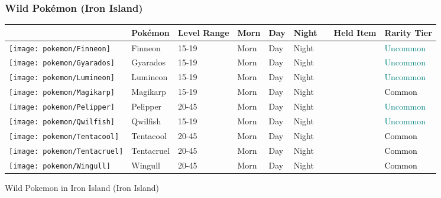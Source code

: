 \subsubsection{Wild Pokémon (Iron Island)}%
\label{ssubsec:WildPokmon(IronIsland)}%
\begin{longtable}{||l l l l l l l l l||}%
\hline%
&Pokémon&Level Range&Morn&Day&Night&&Held Item&Rarity Tier\\%
\hline%
\endhead%
\hline%
\texttt{[image: pokemon/Finneon]}&Finneon&15{-}19&Morn&Day&Night&&&\textcolor{teal}{%
Uncommon%
}\\%
\hline%
\texttt{[image: pokemon/Gyarados]}&Gyarados&15{-}19&Morn&Day&Night&&&\textcolor{teal}{%
Uncommon%
}\\%
\hline%
\texttt{[image: pokemon/Lumineon]}&Lumineon&15{-}19&Morn&Day&Night&&&\textcolor{teal}{%
Uncommon%
}\\%
\hline%
\texttt{[image: pokemon/Magikarp]}&Magikarp&15{-}19&Morn&Day&Night&&&\textcolor{black}{%
Common%
}\\%
\hline%
\texttt{[image: pokemon/Pelipper]}&Pelipper&20{-}45&Morn&Day&Night&&&\textcolor{teal}{%
Uncommon%
}\\%
\hline%
\texttt{[image: pokemon/Qwilfish]}&Qwilfish&15{-}19&Morn&Day&Night&&&\textcolor{teal}{%
Uncommon%
}\\%
\hline%
\texttt{[image: pokemon/Tentacool]}&Tentacool&20{-}45&Morn&Day&Night&&&\textcolor{black}{%
Common%
}\\%
\hline%
\texttt{[image: pokemon/Tentacruel]}&Tentacruel&20{-}45&Morn&Day&Night&&&\textcolor{black}{%
Common%
}\\%
\hline%
\texttt{[image: pokemon/Wingull]}&Wingull&20{-}45&Morn&Day&Night&&&\textcolor{black}{%
Common%
}\\%
\hline%
\end{longtable}%
\caption{Wild Pokemon in Iron Island (Iron Island)}